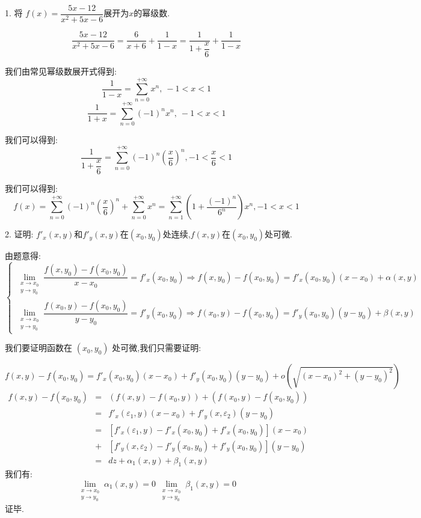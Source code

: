 1. 将 $f(x)=\dfrac{5x-12}{x^2+5x-6}$展开为$x$的幂级数.
\begin{solution}
	$$\frac{5x-12}{x^2+5x-6}=\frac{6}{x+6}+\frac{1}{1-x}=\dfrac{1}{1+\dfrac{x}{6}}+\frac{1}{1-x}$$
	
	我们由常见幂级数展开式得到: 
	$$\frac{1}{1-x}=\sum\limits_{n=0}^{+\infty}x^{n},\ -1<x<1$$
	$$\frac{1}{1+x}=\sum\limits_{n=0}^{+\infty}(-1)^{n}x^{n},\ -1<x<1$$
	
	我们可以得到: 
	$$\dfrac{1}{1+\dfrac{x}{6}}=\sum\limits_{n=0}^{+\infty}(-1)^{n}(\frac{x}{6})^{n},-1<\frac{x}{6}<1$$
	
	我们可以得到: 
	$$f(x)=\sum\limits_{n=0}^{+\infty}(-1)^{n}(\frac{x}{6})^{n}+\sum\limits_{n=0}^{+\infty}x^{n}=\sum\limits_{n=1}^{+\infty}(1+\frac{(-1)^n}{6^n})x^n,-1<x<1$$
	
\end{solution}


2. 证明: $f'_{x}(x,y)$和$f'_{y}(x,y)$在$(x_{0},y_{0})$处连续,$f(x,y)$在$(x_{0},y_{0})$处可微.
\begin{solution}
	
	由题意得: 
	$$\left\lbrace 
	\begin{array}{l}
		\lim\limits_{\substack{x\rightarrow x_{0}\\ y\rightarrow y_{0}}}\dfrac{f(x,y_{0})-f(x_{0},y_{0})}{x-x_{0}}=f'_{x}(x_{0},y_{0})\Rightarrow f(x,y_{0})-f(x_{0},y_{0})=f'_{x}(x_{0},y_{0})(x-x_{0})+\alpha(x,y)\\
		\lim\limits_{\substack{x\rightarrow x_{0}\\ y\rightarrow y_{0}}}\dfrac{f(x_{0},y)-f(x_{0},y_{0})}{y-y_{0}}=f'_{y}(x_{0},y_{0})\Rightarrow f(x_{0},y)-f(x_{0},y_{0})=f'_{y}(x_{0},y_{0})(y-y_{0})+\beta(x,y)
	\end{array}
	\right.$$
	
	我们要证明函数在 $(x_{0},y_{0})$ 处可微,我们只需要证明: 
	
	$$f(x,y)-f(x_{0},y_{0})=f'_{x}(x_{0},y_{0})(x-x_{0})+f'_{y}(x_{0},y_{0})(y-y_{0})+o(\sqrt{(x-x_{0})^2+(y-y_{0})^2})$$
	\begin{eqnarray*}
		f(x,y)-f(x_{0},y_{0})&=&(f(x,y)-f(x_{0},y))+(f(x_{0},y)-f(x_{0},y_{0}))\\
		&=&f'_{x}(\varepsilon_{1},y)(x-x_{0})+f'_{y}(x,\varepsilon_{2})(y-y_{0})\\
		&=&\left[f'_{x}(\varepsilon_{1},y)-f'_{x}(x_{0},y_{0})+f'_{x}(x_{0},y_{0}) \right](x-x_{0})\\ &+&\left[f'_{y}(x,\varepsilon_{2})-f'_{y}(x_{0},y_{0})+f'_{y}(x_{0},y_{0}) \right](y-y_{0})\\
		&=&dz+\alpha_{1}(x,y)+\beta_{1}(x,y)
	\end{eqnarray*}
	我们有: 
	$$\lim\limits_{\substack{x\rightarrow x_{0}\\ y\rightarrow y_{0}}}\alpha_{1}(x,y)=0\ \lim\limits_{\substack{x\rightarrow x_{0}\\ y\rightarrow y_{0}}}\beta_{1}(x,y)=0$$
	证毕.
\end{solution}

